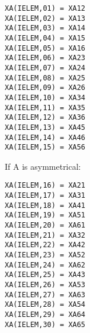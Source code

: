 \begin{lstlisting}[language=TelFortran]
XA(IELEM,01) = XA12
XA(IELEM,02) = XA13
XA(IELEM,03) = XA14
XA(IELEM,04) = XA15
XA(IELEM,05) = XA16
XA(IELEM,06) = XA23
XA(IELEM,07) = XA24
XA(IELEM,08) = XA25
XA(IELEM,09) = XA26
XA(IELEM,10) = XA34
XA(IELEM,11) = XA35
XA(IELEM,12) = XA36
XA(IELEM,13) = XA45
XA(IELEM,14) = XA46
XA(IELEM,15) = XA56
\end{lstlisting}

If A is asymmetrical:
\begin{lstlisting}[language=TelFortran]
XA(IELEM,16) = XA21
XA(IELEM,17) = XA31
XA(IELEM,18) = XA41
XA(IELEM,19) = XA51
XA(IELEM,20) = XA61
XA(IELEM,21) = XA32
XA(IELEM,22) = XA42
XA(IELEM,23) = XA52
XA(IELEM,24) = XA62
XA(IELEM,25) = XA43
XA(IELEM,26) = XA53
XA(IELEM,27) = XA63
XA(IELEM,28) = XA54
XA(IELEM,29) = XA64
XA(IELEM,30) = XA65
\end{lstlisting}
